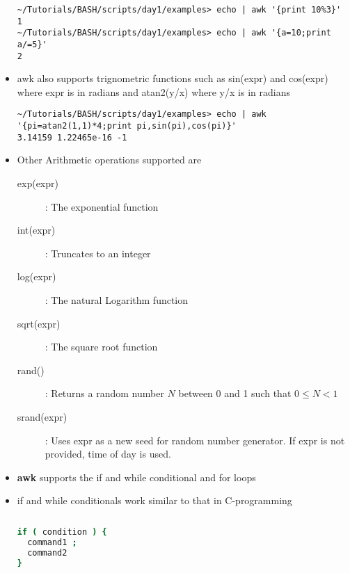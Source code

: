 \documentclass[10pt,t]{beamer}
\begin{document}
\begin{frame}
\begin{itemize}
\begin{columns}
\begin{center}
    \end{center}
    \end{columns}
    \begin{lstlisting}[style=LINUX]
~/Tutorials/BASH/scripts/day1/examples> echo | awk '{print 10%3}'
1
~/Tutorials/BASH/scripts/day1/examples> echo | awk '{a=10;print a/=5}'
2
    \end{lstlisting}
    \item awk also supports trignometric functions such as sin(expr) and cos(expr) where expr is in radians and atan2(y/x) where y/x is in radians
    \begin{lstlisting}[style=LINUX]
~/Tutorials/BASH/scripts/day1/examples> echo | awk '{pi=atan2(1,1)*4;print pi,sin(pi),cos(pi)}'
3.14159 1.22465e-16 -1
    \end{lstlisting}
    \framebreak
    \item Other Arithmetic operations supported are
    \begin{description}
      \item[exp(expr)]: The exponential function
      \item[int(expr)]: Truncates to an integer
      \item[log(expr)]: The natural Logarithm function
      \item[sqrt(expr)]: The square root function
      \item[rand()]: Returns a random number $N$ between 0 and 1 such that $0\le N < 1$
      \item[srand(expr)]: Uses expr as a new seed for random number generator. If expr is not provided, time of day is used.
    \end{description}
    \item \textbf{awk} supports the if and while conditional and for loops
    \item if and while conditionals work similar to that in C-programming
    \begin{columns}
      \begin{exampleblock}{}
        \begin{lstlisting}[language=bash]
if ( condition ) {
  command1 ;
  command2
}
        \end{lstlisting}
      \end{exampleblock}
      \begin{exampleblock}{}
        \begin{lstlisting}[language=bash]

\end{lstlisting}
\end{exampleblock}
\end{columns}
\end{itemize}
\end{frame}
\end{document}
